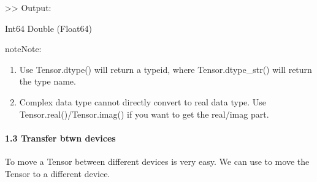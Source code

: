 \documentclass[letterpaper,10pt,english]{sphinxmanual}
\begin{document}
\begin{sphinxVerbatim}[commandchars=\\\{\},numbers=left,firstnumber=1,stepnumber=1]
   
   
    
    
\end{sphinxVerbatim}

\textgreater{}\textgreater{} Output:

\begin{sphinxVerbatim}[commandchars=\\\{\}]
Int64
Double (Float64)
\end{sphinxVerbatim}

\begin{sphinxadmonition}{note}{Note:}\begin{enumerate}
%
\item {} 
Use Tensor.dtype() will return a type\sphinxhyphen{}id, where Tensor.dtype\_str() will return the type name.

\item {} 
Complex data type cannot directly convert to real data type. Use Tensor.real()/Tensor.imag() if you want to get the real/imag part.

\end{enumerate}
\end{sphinxadmonition}


\paragraph{1.3 Transfer btwn devices}
\label{\detokenize{guide/basic_obj/Tensor_1_creat:transfer-btwn-devices}}
To move a Tensor between different devices is very easy. We can use  to move the Tensor to a different device.
\end{document}
